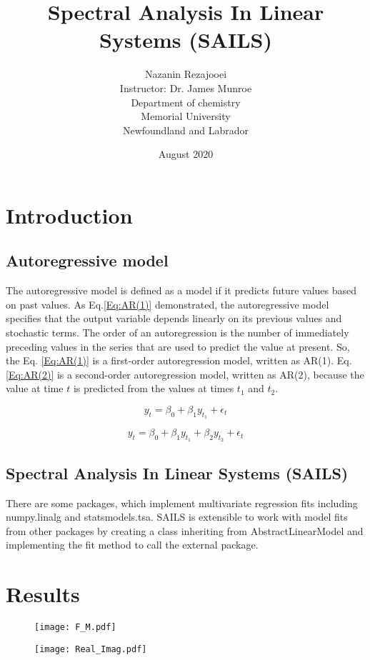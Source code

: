 \documentclass[12pt]{article}
\title {\textbf{Spectral Analysis In Linear Systems (SAILS)} \vspace{2 cm}}
\author{\huge \vspace{1.5 cm} Nazanin Rezajooei \\ \vspace{1 cm} Instructor: Dr. James Munroe \vspace{3 cm}\\  Department of chemistry \\ Memorial University \\ Newfoundland and Labrador}
\date{\vspace{1.5 cm}  August 2020}
\begin{document}
\maketitle
\newpage

\section{Introduction}
\subsection{Autoregressive model}

The autoregressive model is defined as a model if it predicts future values based on past values.
As Eq.\ref{Eq:AR(1)} demonstrated,  the autoregressive model specifies that the output variable depends linearly on its previous values and stochastic terms. The order of an autoregression is the number of immediately preceding values in the series that are used to predict the value at present. So, the Eq. \ref{Eq:AR(1)} is a first-order autoregression model, written as AR(1). Eq.\ref{Eq:AR(2)} is a second-order autoregression model, written as AR(2), because the value at time $t$ is predicted from the values at times $t_1$ and $t_2$.

\begin{equation}
    y_t = \beta_0 + \beta_1 y_{t_1} + \epsilon_t
    \label{Eq:AR(1)}
\end{equation}

\begin{equation}
    y_t = \beta_0 + \beta_1 y_{t_1} + \beta_2 y_{t_2} + \epsilon_t
    \label{Eq:AR(2)}
\end{equation}

\subsection{Spectral Analysis In Linear Systems (SAILS)}

There are some packages, which implement multivariate regression fits including numpy.linalg and statsmodels.tsa. SAILS is extensible to work with model fits from other packages by creating a class inheriting from AbstractLinearModel and implementing the fit method to call the
external package.

\section{Results}

\begin{figure}[h]
    \centering
    \texttt{[image: F\_M.pdf]}
    \caption{}
    \label{fig:F_M}
\end{figure}

\begin{figure}[h]
    \centering
    \texttt{[image: Real\_Imag.pdf]}
    \caption{}
    \label{fig:Real_Imag}
\end{figure}

%
%
\end{document}
